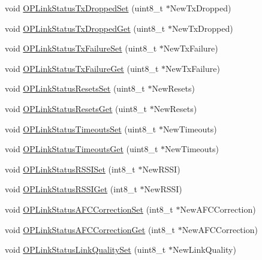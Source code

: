 \begin{DoxyCompactItemize}
\item 
void \hyperlink{group___o_p_link_status_ga092f2673649a04ebe3b01d4c836bb04f}{\-O\-P\-Link\-Status\-Tx\-Dropped\-Set} (uint8\-\_\-t $\ast$\-New\-Tx\-Dropped)
\item 
void \hyperlink{group___o_p_link_status_gadcbee5b1fbcecf17fb075b359872d3cc}{\-O\-P\-Link\-Status\-Tx\-Dropped\-Get} (uint8\-\_\-t $\ast$\-New\-Tx\-Dropped)
\item 
void \hyperlink{group___o_p_link_status_ga60470aa398d24e3edf925c1dbe74acab}{\-O\-P\-Link\-Status\-Tx\-Failure\-Set} (uint8\-\_\-t $\ast$\-New\-Tx\-Failure)
\item 
void \hyperlink{group___o_p_link_status_ga41ca63ca58ab4618989f892597c80b3d}{\-O\-P\-Link\-Status\-Tx\-Failure\-Get} (uint8\-\_\-t $\ast$\-New\-Tx\-Failure)
\item 
void \hyperlink{group___o_p_link_status_ga9f1a4f904beb629d5183a6edbad17277}{\-O\-P\-Link\-Status\-Resets\-Set} (uint8\-\_\-t $\ast$\-New\-Resets)
\item 
void \hyperlink{group___o_p_link_status_ga367005b1a308b15a61b94ebf4abd16ac}{\-O\-P\-Link\-Status\-Resets\-Get} (uint8\-\_\-t $\ast$\-New\-Resets)
\item 
void \hyperlink{group___o_p_link_status_ga6fea0bcc9dc98491c3031b07305eb4e0}{\-O\-P\-Link\-Status\-Timeouts\-Set} (uint8\-\_\-t $\ast$\-New\-Timeouts)
\item 
void \hyperlink{group___o_p_link_status_ga4e4387947e244dc5cfffd887edca9bc1}{\-O\-P\-Link\-Status\-Timeouts\-Get} (uint8\-\_\-t $\ast$\-New\-Timeouts)
\item 
void \hyperlink{group___o_p_link_status_gae728698708f0f192a9a44625836246f2}{\-O\-P\-Link\-Status\-R\-S\-S\-I\-Set} (int8\-\_\-t $\ast$\-New\-R\-S\-S\-I)
\item 
void \hyperlink{group___o_p_link_status_gac6c6c9d34222e5882093f15c5f59fd33}{\-O\-P\-Link\-Status\-R\-S\-S\-I\-Get} (int8\-\_\-t $\ast$\-New\-R\-S\-S\-I)
\item 
void \hyperlink{group___o_p_link_status_ga51d090ca78ca4b4e0e47f7fbfdbd79f5}{\-O\-P\-Link\-Status\-A\-F\-C\-Correction\-Set} (int8\-\_\-t $\ast$\-New\-A\-F\-C\-Correction)
\item 
void \hyperlink{group___o_p_link_status_ga7063554f78f38c3a0dfc8291f24ffa7e}{\-O\-P\-Link\-Status\-A\-F\-C\-Correction\-Get} (int8\-\_\-t $\ast$\-New\-A\-F\-C\-Correction)
\item 
void \hyperlink{group___o_p_link_status_gad4b43ea084ee64aa2f5b66f01b1faeeb}{\-O\-P\-Link\-Status\-Link\-Quality\-Set} (uint8\-\_\-t $\ast$\-New\-Link\-Quality)

\end{DoxyCompactItemize}
